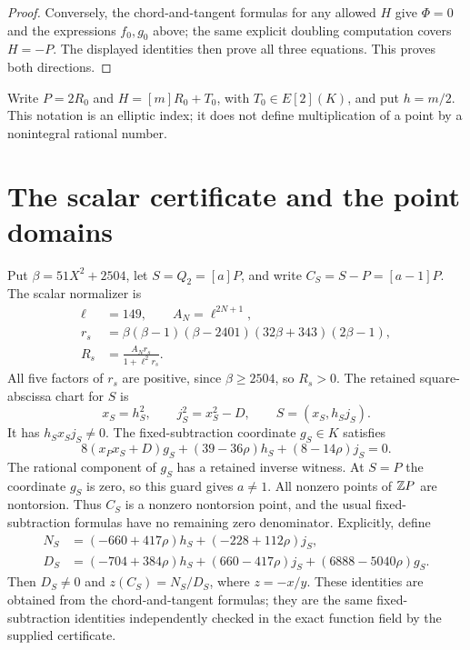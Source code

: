 \documentclass[11pt,a4paper]{article}
\begin{document}
\begin{proof}
Conversely, the chord-and-tangent formulas for any allowed $H$ give
$\Phi=0$ and the expressions $f_0,g_0$ above; the same explicit
doubling computation covers $H=-P$. The displayed identities then
prove all three equations. This proves both directions.
\end{proof}

Write $P=2R_0$ and $H=[m]R_0+T_0$, with $T_0\in E[2](K)$, and put $h=m/2$.
This notation is an elliptic index; it does not define multiplication
of a point by a nonintegral rational number.


\section{The scalar certificate and the point domains}\label{sec:scalar}
Put $\beta=51X^2+2504$, let $S=Q_2=[a]P$, and write
$C_S=S-P=[a-1]P$. The scalar normalizer is
\begin{equation}\label{eq:scalarnormalizer}
 \begin{split}
 \ell&=149,\qquad A_N=\ell^{2N+1},\\
 r_s&=\beta(\beta-1)(\beta-2401)(32\beta+343)(2\beta-1),\\
 R_s&=\frac{A_Nr_s}{1+\ell^2r_s}.
 \end{split}
\end{equation}
All five factors of $r_s$ are positive, since $\beta\ge2504$, so
$R_s>0$. The retained square-abscissa chart for $S$ is
\[
 x_S=h_S^2,\qquad j_S^2=x_S^2-D,
 \qquad S=(x_S,h_Sj_S).
\]
It has $h_Sx_Sj_S\ne0$. The fixed-subtraction coordinate $g_S\in K$
satisfies
\[
 8(x_Px_S+D)g_S+(39-36\rho)h_S+(8-14\rho)j_S=0.
\]
The rational component of $g_S$ has a retained inverse witness.
At $S=P$ the coordinate $g_S$ is zero, so this guard gives $a\ne1$.
All nonzero points of $\mathbb Z P$ are nontorsion. Thus $C_S$ is a nonzero
nontorsion point, and the usual fixed-subtraction formulas have no
remaining zero denominator. Explicitly, define
\[
 \begin{split}
 N_S&=(-660+417\rho)h_S+(-228+112\rho)j_S,\\
 D_S&=(-704+384\rho)h_S+(660-417\rho)j_S
                         +(6888-5040\rho)g_S.
 \end{split}
\]
Then $D_S\ne0$ and $z(C_S)=N_S/D_S$, where $z=-x/y$.
These identities are obtained from the chord-and-tangent formulas;
they are the same fixed-subtraction identities independently checked
in the exact function field by the supplied certificate.
\end{document}
